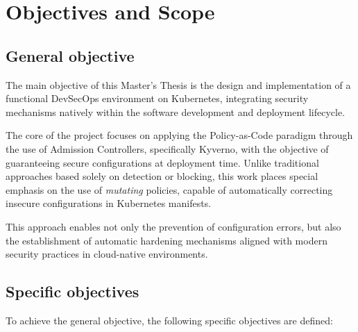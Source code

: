 \chapter{Objectives and Scope}

\section{General objective}

The main objective of this Master's Thesis is the design and implementation of a functional DevSecOps environment on Kubernetes, integrating security mechanisms natively within the software development and deployment lifecycle.

The core of the project focuses on applying the Policy-as-Code paradigm through the use of Admission Controllers, specifically Kyverno, with the objective of guaranteeing secure configurations at deployment time. Unlike traditional approaches based solely on detection or blocking, this work places special emphasis on the use of \textit{mutating} policies, capable of automatically correcting insecure configurations in Kubernetes manifests.

This approach enables not only the prevention of configuration errors, but also the establishment of automatic hardening mechanisms aligned with modern security practices in cloud-native environments.

\section{Specific objectives}

To achieve the general objective, the following specific objectives are defined:

